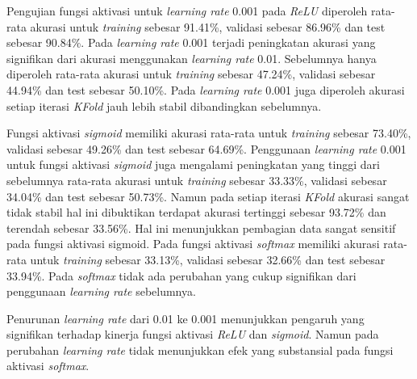     Pengujian fungsi aktivasi untuk \textit{learning rate} 0.001 
    pada \textit{ReLU} diperoleh rata-rata akurasi untuk \textit{training} sebesar 91.41\%, validasi sebesar 86.96\% dan test sebesar 90.84\%. Pada \textit{learning rate} 0.001 terjadi peningkatan akurasi yang signifikan dari akurasi menggunakan \textit{learning rate} 0.01. Sebelumnya hanya diperoleh rata-rata akurasi untuk \textit{training} sebesar 47.24\%, validasi sebesar 44.94\% dan test sebesar 50.10\%. Pada \textit{learning rate} 0.001 juga diperoleh akurasi setiap iterasi \textit{KFold} jauh lebih stabil dibandingkan sebelumnya. 

    Fungsi aktivasi \textit{sigmoid} memiliki akurasi rata-rata untuk \textit{training} sebesar 73.40\%, validasi sebesar 49.26\% dan test sebesar 64.69\%. Penggunaan \textit{learning rate} 0.001 untuk fungsi aktivasi \textit{sigmoid} juga mengalami peningkatan yang tinggi dari sebelumnya rata-rata akurasi untuk \textit{training} sebesar 33.33\%, validasi sebesar 34.04\% dan test sebesar 50.73\%. Namun pada setiap iterasi \textit{KFold} akurasi sangat tidak stabil hal ini dibuktikan terdapat akurasi tertinggi sebesar 93.72\% dan terendah sebesar 33.56\%. Hal ini menunjukkan pembagian data sangat sensitif pada fungsi aktivasi sigmoid. Pada fungsi aktivasi \textit{softmax} memiliki akurasi rata-rata untuk \textit{training} sebesar 33.13\%, validasi sebesar 32.66\% dan test sebesar 33.94\%. Pada \textit{softmax} tidak ada perubahan yang cukup signifikan dari penggunaan \textit{learning rate} sebelumnya. 

     Penurunan \textit{learning rate} dari 0.01 ke 0.001 menunjukkan pengaruh yang signifikan terhadap kinerja fungsi aktivasi \textit{ReLU} dan \textit{sigmoid}. Namun pada perubahan \textit{learning rate} tidak menunjukkan efek yang substansial pada fungsi aktivasi \textit{softmax}.
    
    
    
    

   

